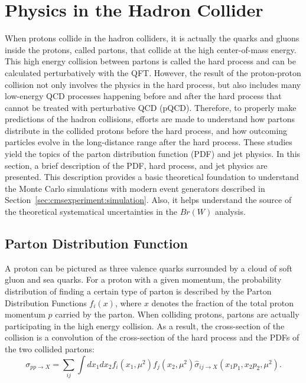 

\section{Physics in the Hadron Collider}
\label{sec:relatedWorks:ppCollision} 

When protons collide in the hadron colliders, it is actually the quarks and gluons inside the protons, called partons, that collide at the high center-of-mass energy. This high energy collision between partons is called the hard process and can be calculated perturbatively with the QFT. However, the result of the proton-proton collision not only involves the physics in the hard process, but also includes many low-energy QCD processes happening before and after the hard process that cannot be treated with perturbative QCD (pQCD). Therefore, to properly make predictions of the hadron collisions, efforts are made to understand how partons distribute in the collided protons before the hard process, and how outcoming particles evolve in the long-distance range after the hard process. These studies yield the topics of the parton distribution function (PDF) and jet physics. In this section, a brief description of the PDF, hard process, and jet physics are presented. This description provides a basic theoretical foundation to understand the Monte Carlo simulations with modern event generators described in Section~\ref{sec:cmsexperiment:simulation}. Also, it helps understand the source of the theoretical systematical uncertainties in the $Br(W)$ analysis.

\subsection{Parton Distribution Function}
\label{sec:relatedWorks:ppCollision:pdf} 


A proton can be pictured as three valence quarks surrounded by a cloud of soft gluon and sea quarks. For a proton with a given momentum, the probability distribution of finding a certain type of parton is described by the Parton Distribution Functions $f_i(x)$, where $x$ denotes the fraction of the total proton momentum $p$ carried by the parton. When colliding protons, partons are actually participating in the high energy collision. As a result, the cross-section of the collision is a convolution of the cross-section of the hard process and the PDFs of the two collided partons:
\begin{equation}
    \sigma_{pp\to X } = \sum_{ij}\int dx_1 dx_2 f_i(x_1, \mu^2) f_j(x_2, \mu^2) \hat{\sigma}_{ij\to X } (x_1 p_1, x_2 p_2,\mu^2) .
    \label{eqn:relatedWorks:qft:ppCollision:factorization}
\end{equation}

